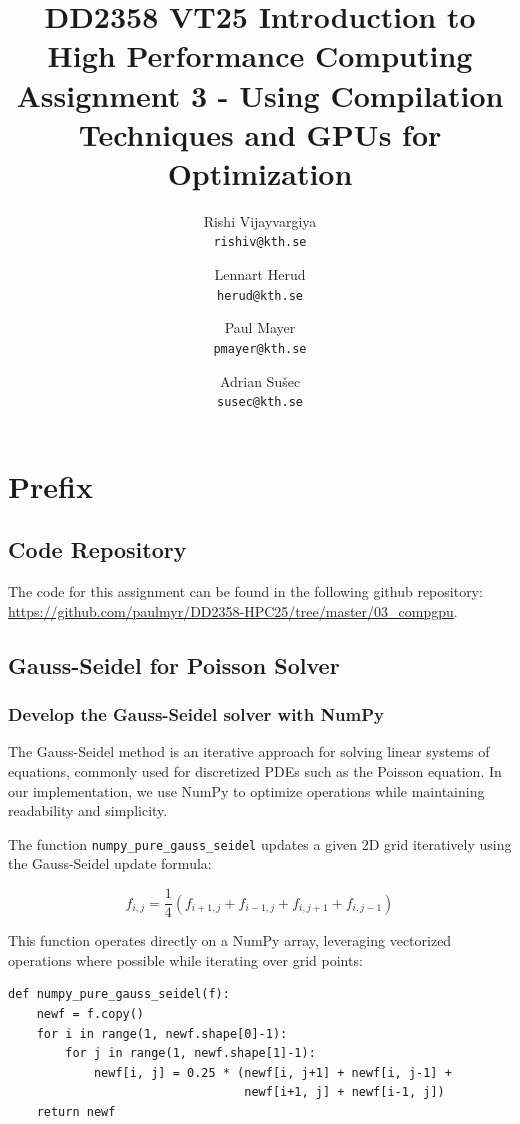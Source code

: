 \documentclass[a4paper,12pt]{article}
\title{
  \normalsize{DD2358 VT25 Introduction to}\\
  \normalsize{High Performance Computing}\\
  \large{Assignment 3 - Using Compilation Techniques and GPUs for Optimization}\\
}
\author{
  \small Rishi Vijayvargiya\\[-0.75ex]
  \scriptsize\texttt{rishiv@kth.se}
  \and
  \small Lennart Herud\\[-0.75ex]
  \scriptsize\texttt{herud@kth.se}
  \and
  \small Paul Mayer\\[-0.75ex]
  \scriptsize\texttt{pmayer@kth.se}
  \and
  \small Adrian Sušec\\[-0.75ex]
  \scriptsize\texttt{susec@kth.se}
}
\date{}
\begin{document}
\maketitle
\thispagestyle{firstpagestyle}

\listoftodos

\vspace{1em}

%
\section*{Prefix}

%

\subsection*{Code Repository}
The code for this assignment can be found in the following github repository: \url{https://github.com/paulmyr/DD2358-HPC25/tree/master/03_compgpu}.

\subsection{Gauss-Seidel for Poisson Solver}
\subsubsection{Develop the Gauss-Seidel solver with NumPy}
The Gauss-Seidel method is an iterative approach for solving linear systems of equations, commonly used for discretized PDEs such as the Poisson equation. In our implementation, we use NumPy to optimize operations while maintaining readability and simplicity.

The function \texttt{numpy\_pure\_gauss\_seidel} updates a given 2D grid iteratively using the Gauss-Seidel update formula:

\begin{equation}
    f_{i,j} = \frac{1}{4} \left( f_{i+1,j} + f_{i-1,j} + f_{i,j+1} + f_{i,j-1} \right)
\end{equation}

This function operates directly on a NumPy array, leveraging vectorized operations where possible while iterating over grid points:

\begin{verbatim}
def numpy_pure_gauss_seidel(f):
    newf = f.copy()
    for i in range(1, newf.shape[0]-1):
        for j in range(1, newf.shape[1]-1):
            newf[i, j] = 0.25 * (newf[i, j+1] + newf[i, j-1] +
                                 newf[i+1, j] + newf[i-1, j])
    return newf
\end{verbatim}
\end{document}
